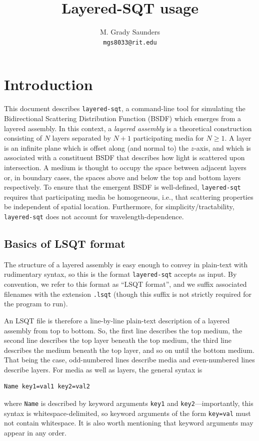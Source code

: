 \documentclass[
    twoside,
    twocolumn,
    letterpaper,
    10pt]{article}
\begin{document}
\title{Layered-SQT usage}
\author{
M. Grady Saunders\\
\texttt{mgs8033@rit.edu}}
\date{}
\maketitle

\section{Introduction}

This document describes \texttt{layered-sqt}, a command-line 
tool for simulating the Bidirectional Scattering Distribution 
Function (BSDF) which emerges from a layered assembly. In this
context, a \emph{layered assembly} is a theoretical construction
consisting of $N$ layers separated by $N+1$ participating media for
$N \ge 1$. A layer is an infinite plane which is offset along (and 
normal to) the $z$-axis, and which is associated with a constituent 
BSDF that describes how light is scattered upon intersection. 
A medium is thought to occupy the space between adjacent layers or, 
in boundary cases, the spaces above and below the top and bottom 
layers respectively. 
To ensure that the emergent BSDF is well-defined, 
\texttt{layered-sqt} requires that participating media be homogeneous,
i.e., that scattering properties be independent of spatial location. 
Furthermore, for simplicity/tractability, \texttt{layered-sqt} does 
not account for wavelength-dependence.

\subsection{Basics of LSQT format}

The structure of a layered assembly is easy enough to convey 
in plain-text with rudimentary syntax, so this is the format 
\texttt{layered-sqt}
accepts as input. By convention, we refer to this format as
``LSQT format'', and we suffix associated filenames with the extension 
\texttt{.lsqt} (though this suffix is not strictly required for the program
to run). 

An LSQT file is therefore a line-by-line plain-text description of a 
layered assembly from top to bottom. So, the first line describes the 
top medium, the second line describes the top layer beneath the top medium, 
the third line describes the medium beneath the top layer, and so on until 
the bottom medium. That being the case, odd-numbered lines describe media
and even-numbered lines describe layers. For media as well as layers, 
the general syntax is 
\begin{verbatim}
Name key1=val1 key2=val2
\end{verbatim}
where \texttt{Name} is described by keyword arguments 
\texttt{key1} and \texttt{key2}---importantly, this syntax is
whitespace-delimited, so keyword arguments of the form \texttt{key=val} 
must not contain whitespace. It is also worth mentioning that 
keyword arguments may appear in any order.
\end{document}
